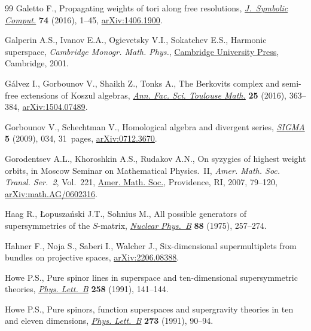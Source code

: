 \documentclass[10pt,a4paper]{amsart}
\numberwithin{equation}{section}
\begin{document}
\begin{thebibliography}{99}
Galetto F., Propagating weights of tori along free resolutions,
 \href{https://doi.org/10.1016/j.jsc.2015.05.004}{\textit{J.~Symbolic Comput.}} \textbf{74} (2016), 1--45, \href{https://arxiv.org/abs/1406.1900}{arXiv:1406.1900}.

Galperin A.S., Ivanov E.A., Ogievetsky V.I., Sokatchev E.S., Harmonic
 superspace, \textit{Cambridge Monogr. Math. Phys.}, \href{https://doi.org/10.1017/CBO9780511535109}{Cambridge University Press},
 Cambridge, 2001.

G\'alvez I., Gorbounov V., Shaikh Z., Tonks A., The {B}erkovits complex and
 semi-free extensions of {K}oszul algebras, \href{https://doi.org/10.5802/afst.1497}{\textit{Ann. Fac. Sci. Toulouse
 Math.}} \textbf{25} (2016), 363--384, \href{https://arxiv.org/abs/1504.07489}{arXiv:1504.07489}.

Gorbounov V., Schechtman V., Homological algebra and divergent series,
 \href{https://doi.org/10.3842/SIGMA.2009.034}{\textit{SIGMA}} \textbf{5} (2009), 034, 31~pages, \href{https://arxiv.org/abs/0712.3670}{arXiv:0712.3670}.

Gorodentsev A.L., Khoroshkin A.S., Rudakov A.N., On syzygies of highest weight
 orbits, in Moscow {S}eminar on {M}athematical {P}hysics.~{II}, \textit{Amer.
 Math. Soc. Transl. Ser.~2}, Vol.~221, \href{https://doi.org/10.1090/trans2/221/05}{Amer. Math. Soc.}, Providence, RI, 2007,
 79--120, \href{https://arxiv.org/abs/math.AG/0602316}{arXiv:math.AG/0602316}.

Haag R., {\L}opusza\'nski J.T., Sohnius M., All possible generators of
 supersymmetries of the {$S$}-matrix, \href{https://doi.org/10.1016/0550-3213(75)90279-5}{\textit{Nuclear Phys.~B}} \textbf{88}
 (1975), 257--274.

Hahner F., Noja S., Saberi I., Walcher J., Six-dimensional supermultiplets from
 bundles on projective spaces, \href{https://arxiv.org/abs/2206.08388}{arXiv:2206.08388}.

Howe P.S., Pure spinor lines in superspace and ten-dimensional supersymmetric
 theories, \href{https://doi.org/10.1016/0370-2693(91)91221-G}{\textit{Phys. Lett.~B}} \textbf{258} (1991), 141--144.

Howe P.S., Pure spinors, function superspaces and supergravity theories in ten
 and eleven dimensions, \href{https://doi.org/10.1016/0370-2693(91)90558-8}{\textit{Phys. Lett.~B}} \textbf{273} (1991), 90--94.


\end{thebibliography}
\end{document}
